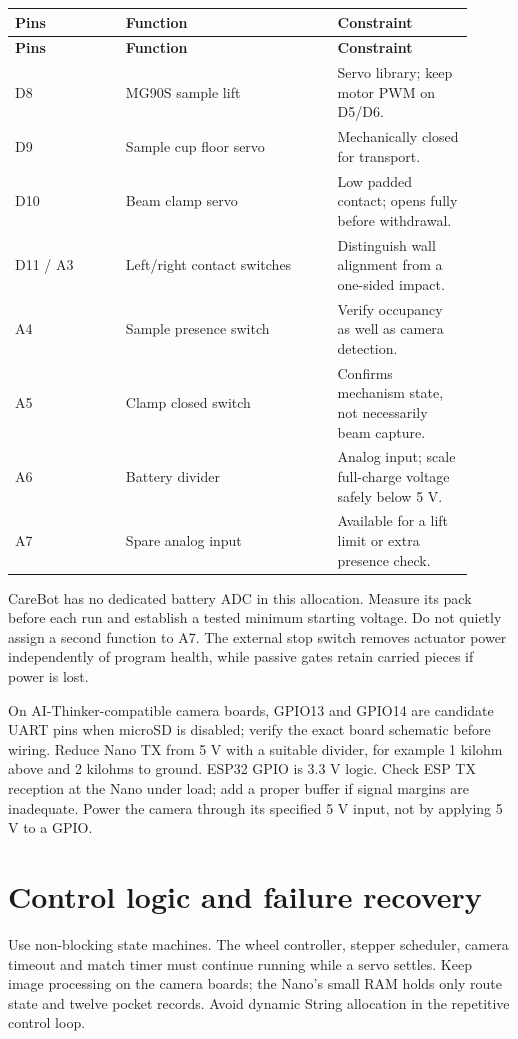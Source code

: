 \documentclass[10pt,a4paper]{article}
\begin{document}
\small\begin{longtable}{@{}>{\raggedright\arraybackslash}p{0.22\linewidth}>{\raggedright\arraybackslash}p{0.42\linewidth}>{\raggedright\arraybackslash}p{0.27\linewidth}@{}}
\toprule
\textbf{Pins} & \textbf{Function} & \textbf{Constraint} \\
\midrule\endfirsthead
\toprule\textbf{Pins} & \textbf{Function} & \textbf{Constraint} \\\midrule\endhead
D8 & MG90S sample lift & Servo library; keep motor PWM on D5/D6. \\[3pt]
D9 & Sample cup floor servo & Mechanically closed for transport. \\[3pt]
D10 & Beam clamp servo & Low padded contact; opens fully before withdrawal. \\[3pt]
D11 / A3 & Left/right contact switches & Distinguish wall alignment from a one-sided impact. \\[3pt]
A4 & Sample presence switch & Verify occupancy as well as camera detection. \\[3pt]
A5 & Clamp closed switch & Confirms mechanism state, not necessarily beam capture. \\[3pt]
A6 & Battery divider & Analog input; scale full-charge voltage safely below 5 V. \\[3pt]
A7 & Spare analog input & Available for a lift limit or extra presence check. \\[3pt]
\bottomrule\end{longtable}\normalsize
CareBot has no dedicated battery ADC in this allocation. Measure its pack before each run and establish a tested minimum starting voltage. Do not quietly assign a second function to A7. The external stop switch removes actuator power independently of program health, while passive gates retain carried pieces if power is lost.

On AI-Thinker-compatible camera boards, GPIO13 and GPIO14 are candidate UART pins when microSD is disabled; verify the exact board schematic before wiring. Reduce Nano TX from 5 V with a suitable divider, for example 1 kilohm above and 2 kilohms to ground. ESP32 GPIO is 3.3 V logic. Check ESP TX reception at the Nano under load; add a proper buffer if signal margins are inadequate. Power the camera through its specified 5 V input, not by applying 5 V to a GPIO.

\section{Control logic and failure recovery}
Use non-blocking state machines. The wheel controller, stepper scheduler, camera timeout and match timer must continue running while a servo settles. Keep image processing on the camera boards; the Nano's small RAM holds only route state and twelve pocket records. Avoid dynamic String allocation in the repetitive control loop.
\end{document}
